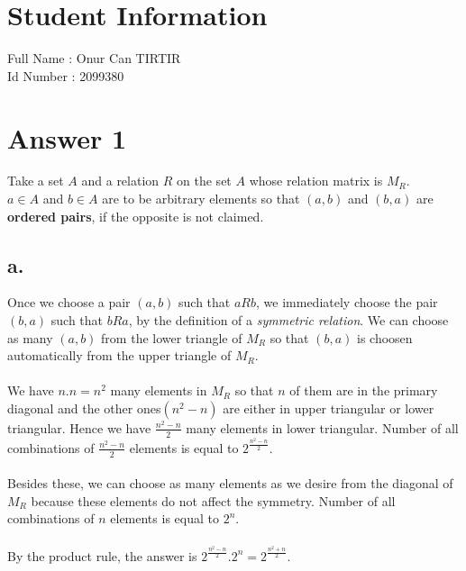 \documentclass[12pt]{article}
\begin{document}
\section*{Student Information } 
Full Name :  Onur Can TIRTIR\\
Id Number :  2099380\\

\section*{Answer 1}

Take a set $A$ and a relation $R$ on the set $A$ whose relation matrix is $M_R$.\\
$a\in A$ and $b\in A$ are to be arbitrary elements so that $(a, b)$ and $(b, a)$ are \textbf{ordered pairs}, if the opposite is not claimed.

\subsection*{a.}
Once we choose a pair $(a, b)$ such that $aRb$, we immediately choose the pair $(b, a)$ such that $bRa$, by the definition of a \textit{symmetric relation}. We can choose as many $(a, b)$ from the lower triangle of $M_R$ so that $(b, a)$ is choosen automatically from the upper triangle of $M_R$.\\ \\
We have $n.n=n^2$ many elements in $M_R$ so that $n$ of them are in the primary diagonal and the other ones$(n^2-n)$ are either in upper triangular or lower triangular. Hence we have $\frac{n^2-n}{2}$ many elements in lower triangular. Number of all combinations of $\frac{n^2-n}{2}$ elements is equal to $2^{\frac{n^2-n}{2}}$.\\ \\
Besides these, we can choose as many elements as we desire from the diagonal of $M_R$ because these elements do not affect the symmetry. Number of all combinations of $n$ elements is equal to $2^n$.\\ \\
By the product rule, the answer is $2^{\frac{n^2-n}{2}}.2^n=2^{\frac{n^2+n}{2}}$.
\end{document}
